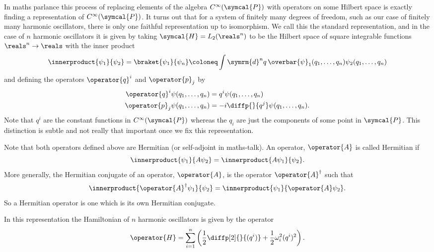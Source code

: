 \documentclass[fleqn]{NotesClass}
\renewcommand{\dl}[1]{\symrm{d}#1}
\newcommand{\phaseSpace}{\symcal{P}}
\newcommand{\hilbertSpace}{\symcal{H}}
\newcommand{\hermit}{{\dagger}}
\begin{document}
    In maths parlance this process of replacing elements of the algebra \(C^{\infty}(\phaseSpace)\) with operators on some Hilbert space is exactly finding a representation of \(C^{\infty}(\phaseSpace)\).
    It turns out that for a system of finitely many degrees of freedom, such as our case of finitely many harmonic oscillators, there is only one faithful representation up to isomorphism.
    We call this the standard representation, and in the case of \(n\) harmonic oscillators it is given by taking \(\hilbertSpace = L_2(\reals^n)\) to be the Hilbert space of square integrable functions \(\reals^n \to \reals\) with the inner product
    \begin{equation}
        \innerproduct{\psi_1}{\psi_2} = \braket{\psi_1}{\psi_n} \coloneq \int \dl{^nq} \, \overbar{\psi}_1(q_1, \dotsc, q_n) \psi_2(q_1, \dotsc, q_n)
    \end{equation}
    and defining the operators \(\operator{q}^i\) and \(\operator{p}_j\) by
    \begin{align}
        \operator{q}^i \psi(q_1, \dotsc, q_n) &= q^i \psi(q_1, \dotsc, q_n)\\
        \operator{p}_j \psi(q_1, \dotsc, q_n) &= -i\diffp{}{q^j}\psi(q_1, \dotsc, q_n).
    \end{align}
    Note that \(q^i\) are the constant functions in \(C^{\infty}(\phaseSpace)\) whereas the \(q_i\) are just the components of some point in \(\phaseSpace\).
    This distinction is subtle and not really that important once we fix this representation.
    
    Note that both operators defined above are Hermitian (or self-adjoint in maths-talk).
    An operator, \(\operator{A}\) is called Hermitian if
    \begin{equation}
        \innerproduct{\psi_1}{A \psi_2} = \innerproduct{A \psi_1}{\psi_2}.
    \end{equation}
    More generally, the Hermitian conjugate of an operator, \(\operator{A}\), is the operator \(\operator{A}^{\hermit}\) such that
    \begin{equation}
        \innerproduct{\operator{A}^{\hermit}\psi_1}{\psi_2} = \innerproduct{\psi_1}{\operator{A}\psi_2}.
    \end{equation}
    So a Hermitian operator is one which is its own Hermitian conjugate.
    
    In this representation the Hamiltonian of \(n\) harmonic oscillators is given by the operator
    \begin{equation}
        \operator{H} = \sum_{i=1}^n \left( \frac{1}{2} \diffp[2]{}{(q^i)} + \frac{1}{2}\omega_i^2 (q^i)^2 \right).
    \end{equation}
    
\end{document}
